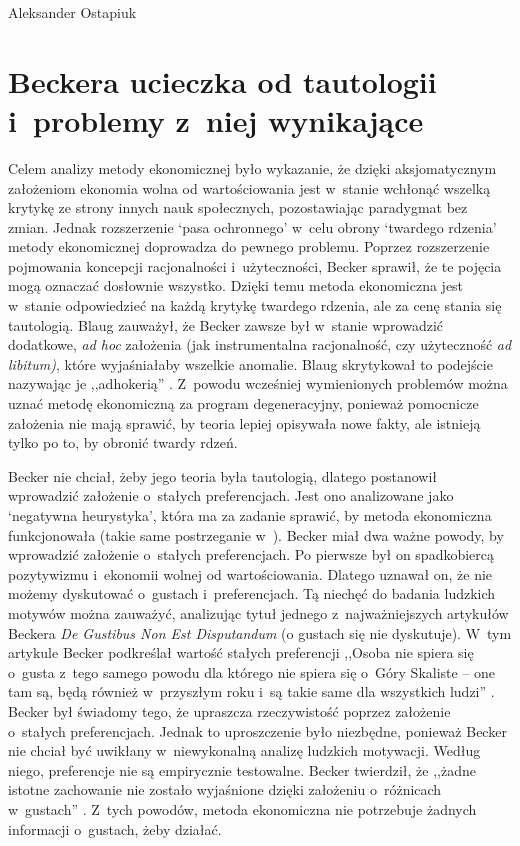 \begin{artplenv}{Aleksander Ostapiuk}
\section{Beckera ucieczka od tautologii i~problemy z~niej wynikające}
Celem analizy metody ekonomicznej było wykazanie, że dzięki aksjomatycznym założeniom ekonomia wolna od wartościowania
jest w~stanie wchłonąć wszelką krytykę ze strony innych nauk społecznych, pozostawiając paradygmat bez zmian. Jednak
rozszerzenie `pasa ochronnego' w~celu obrony `twardego rdzenia' metody ekonomicznej doprowadza do pewnego problemu.
Poprzez rozszerzenie pojmowania koncepcji racjonalności i~użyteczności, Becker sprawił, że te pojęcia mogą oznaczać
dosłownie wszystko. Dzięki temu metoda ekonomiczna jest w~stanie odpowiedzieć na każdą krytykę twardego rdzenia, ale za
cenę stania się tautologią. Blaug zauważył, że Becker zawsze był w~stanie wprowadzić dodatkowe, \textit{ad hoc}
założenia (jak instrumentalna racjonalność, czy użyteczność \textit{ad libitum)}, które wyjaśniałaby wszelkie
anomalie. Blaug skrytykował to podejście nazywając je ,,adhokerią''
\parencite[s.~325–326]{blaug_metodologia_1995}.
Z~powodu wcześniej wymienionych problemów można uznać metodę ekonomiczną za program degeneracyjny, ponieważ pomocnicze
założenia nie mają sprawić, by teoria lepiej opisywała nowe fakty, ale istnieją tylko po to, by obronić twardy rdzeń. 

Becker nie chciał, żeby jego teoria była tautologią, dlatego postanowił wprowadzić założenie o~stałych preferencjach.
Jest ono analizowane jako `negatywna heurystyka', która ma za zadanie sprawić, by metoda ekonomiczna funkcjonowała
(takie same postrzeganie w~\parencite[s.~323–324]{blaug_metodologia_1995}).
Becker miał dwa ważne powody, by
wprowadzić założenie o~stałych preferencjach. Po pierwsze był on spadkobiercą pozytywizmu i~ekonomii wolnej od
wartościowania. Dlatego uznawał on, że nie możemy dyskutować o~gustach i~preferencjach. Tą niechęć do badania ludzkich
motywów można zauważyć, analizując tytuł jednego z~najważniejszych artykułów Beckera \textit{De Gustibus Non Est
Disputandum} (o gustach się nie dyskutuje). W~tym artykule Becker podkreślał wartość stałych preferencji ,,Osoba nie
spiera się o~gusta z~tego samego powodu dla którego nie spiera się o~Góry Skaliste -- one tam są, będą
również w~przyszłym roku i~są takie same dla wszystkich ludzi''
\parencite[s.~76]{becker_gustibus_1977}.
Becker
był świadomy tego, że upraszcza rzeczywistość poprzez założenie o~stałych preferencjach. Jednak to uproszczenie było
niezbędne, ponieważ Becker nie chciał być uwikłany w~niewykonalną analizę ludzkich motywacji. Według niego, preferencje
nie są empirycznie testowalne. Becker twierdził, że ,,żadne istotne zachowanie nie zostało wyjaśnione dzięki
założeniu o~różnicach w~gustach''
\parencite[ s.~89]{becker_gustibus_1977}.
Z~tych powodów, metoda ekonomiczna nie
potrzebuje żadnych informacji o~gustach, żeby działać. 


\end{artplenv}
